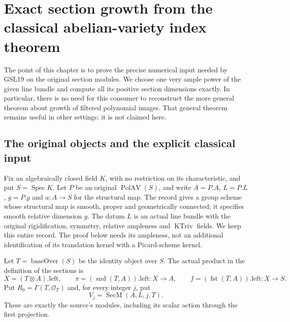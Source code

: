 \section{Exact section growth from the classical abelian-variety index theorem}
\label{sec:SGV}


The point of this chapter is to prove the precise numerical input
needed by GSL19 on the original section modules.  We choose one very
ample power of the given line bundle and compute all its positive
section dimensions exactly.  In particular, there is no need for this
consumer to reconstruct the more general theorem about growth of
filtered polynomial images.  That general theorem remains useful in
other settings; it is not claimed here.

\subsection*{The original objects and the explicit classical input}

Fix an algebraically closed field $K$, with no restriction on its
characteristic, and put $S=\operatorname{Spec}K$.  Let $P$ be an
original $\operatorname{PolAV}(S)$, and write
$A=P.A$, $L=P.L$, $g=P.g$ and $a:A\to S$ for the structural map.
The record gives a group scheme whose structural map is smooth, proper
and geometrically connected; it specifies smooth relative dimension
$g$.  The datum $L$ is an actual line bundle with the original
rigidification, symmetry, relative ampleness and $\operatorname{KTriv}$
fields.  We keep this entire record.  The proof below needs its
ampleness, not an additional identification of its translation kernel
with a Picard-scheme kernel.

Let $T=\operatorname{baseOver}(S)$ be the identity object over $S$.
The actual product in the definition of the sections is
\[
 X=(T\otimes A).\mathrm{left},\qquad
 \pi=(\operatorname{snd}(T,A)).\mathrm{left}:X\longrightarrow A,
 \qquad
 f=(\operatorname{fst}(T,A)).\mathrm{left}:X\longrightarrow S.
\]
Put $R_0=\Gamma(T,\mathcal O_T)$ and, for every integer $j$, put
\[
 V_j=\operatorname{SecM}(A,L,j,T).
                                                        \tag{SGV.1}
\]
These are exactly the source's modules, including its scalar action
through the first projection.

